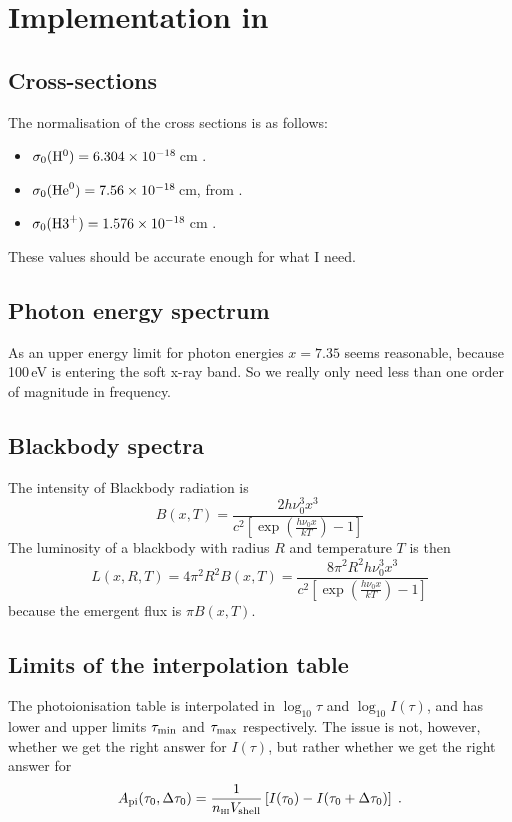 \documentclass[a4paper,11pt]{article}
\begin{document}
\section{Implementation in \pion{}}


\subsection{Cross-sections}
The normalisation of the cross sections is as follows:
\begin{itemize}
\item $\sigma_0(\mathrm{H}^0)  = 6.304\times10^{-18}$\,cm \citep{Ost89}.
\item $\sigma_0(\mathrm{He}^0) = 7.56\times10^{-18}$\,cm, from \citet{MarWes76} \citep[via][]{VerFerKorEA96}.
\item $\sigma_0(\mathrm{H3}^+) = 1.576\times10^{-18}$\,cm \citep{Ost89}.
\end{itemize}
These values should be accurate enough for what I need.

\subsection{Photon energy spectrum}
As an upper energy limit for photon energies $x=7.35$ seems reasonable, because 100\,eV is entering the soft x-ray band.
So we really only need less than one order of magnitude in frequency.


\subsection{Blackbody spectra}
The intensity of Blackbody radiation is \citep[e.g.][]{RybLig79}
\begin{equation}
B(x,T) = \frac{2h\nu_0^3x^3}{c^2\left[\exp\left(\frac{h\nu_0x}{kT}\right)-1\right]}
\end{equation}
The luminosity of a blackbody with radius $R$ and temperature $T$ is then
\begin{equation}
L(x,R,T) = 4\pi^2R^2B(x,T) =
\frac{8\pi^2R^2h\nu_0^3x^3}{c^2\left[\exp\left(\frac{h\nu_0x}{kT}\right)-1\right]}
\end{equation}
because the emergent flux is $\pi B(x,T)$.


\subsection{Limits of the interpolation table}
The photoionisation table is interpolated in $\log_{10}\tau$ and $\log_{10}I(\tau)$, and has lower and upper limits $\tau_{\mathrm{min}}$ and $\tau_{\mathrm{max}}$ respectively.
The issue is not, however, whether we get the right answer for $I(\tau)$, but rather whether we get the right answer for
\begin{equation}
A_{\mathrm{pi}}(\tau_0,\Delta\tau_0) = 
    \frac{1}{n_{\textsc{hi}}V_{\mathrm{shell}}}
    \left[I(\tau_0) - I(\tau_0+\Delta\tau_0)\right]  \;.
\label{eqn:pionFD}
\end{equation}
\end{document}
